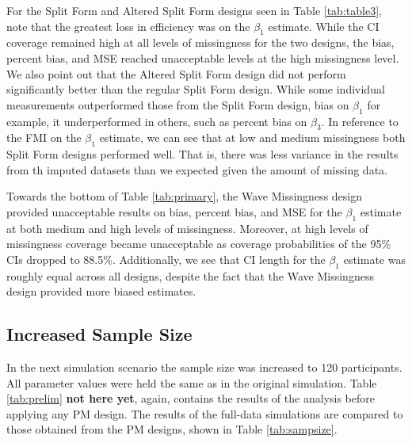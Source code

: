 \documentclass{svjour3}\usepackage[]{graphicx}\usepackage[]{color}
\begin{document}
For the Split Form and Altered Split Form designs seen in Table \ref{tab:table3}, note that the greatest loss in efficiency was on the $\beta_1$ estimate. While the CI coverage remained high at all levels of missingness for the two designs, the bias, percent bias, and MSE reached unacceptable levels at the high missingness level. We also point out that the Altered Split Form design did not perform significantly better than the regular Split Form design. While some individual measurements outperformed those from the Split Form design, bias on $\beta_1$ for example, it underperformed in others, such as percent bias on $\beta_3$. In reference to the FMI on the $\beta_1$ estimate, we can see that at low and medium missingness both Split Form designs performed well. That is, there was less variance in the results from th imputed datasets than we expected given the amount of missing data.\par

Towards the bottom of Table \ref{tab:primary}, the Wave Missingness design provided unacceptable results on bias, percent bias, and MSE for the $\beta_1$ estimate at both medium and high levels of missingness. Moreover, at high levels of missingness coverage became unacceptable as coverage probabilities of the 95\% CIs dropped to 88.5\%.  Additionally, we see that CI length for the $\beta_1$ estimate was roughly equal across all designs, despite the fact that the Wave Missingness design provided more biased estimates. \par

\subsection{Increased Sample Size}
\label{sec:3.2}
In the next simulation scenario the sample size was increased to 120 participants. All parameter values were held the same as in the original simulation. Table \ref{tab:prelim} \textbf{not here yet}, again, contains the results of the analysis before applying any PM design. The results of the full-data simulations are compared to those obtained from the PM designs, shown in Table \ref{tab:sampsize}. \par
\end{document}
